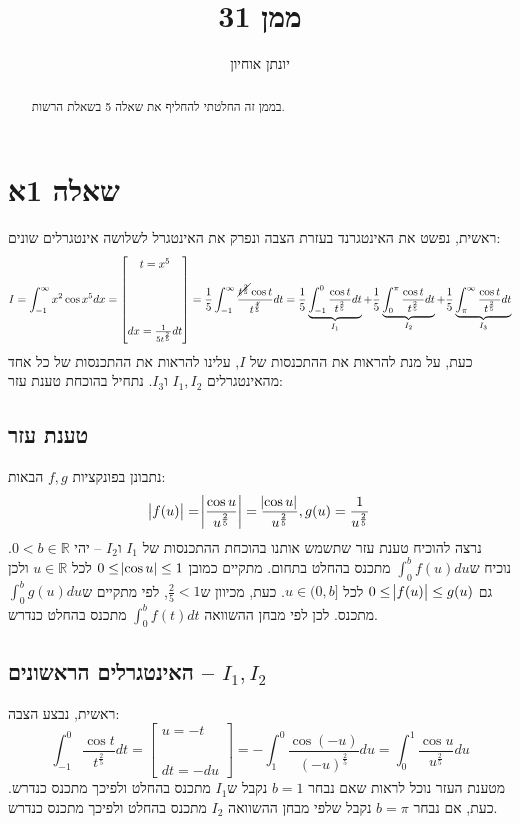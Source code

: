 \documentclass[11pt, oneside]{article}
\title{ממן 31}
\author{יונתן אוחיון}
\newcommand{\br}{\\\\\\\\\\}
\newcommand{\mR}{\mathbb{R}}
\renewcommand{\l}[3]{\R{למה #3#2.#1}}
\newcommand{\defi}[3]{\int_{#1}^{#2} #3}
\newcommand{\sub}[2]{\begin{bmatrix} #1\br #2\end{bmatrix}}
\begin{document}
\maketitle
\begin{abstract}
בממן זה החלטתי להחליף את שאלה 5 בשאלת הרשות.
\end{abstract}
\clearpage

\section*{שאלה 1א}
ראשית, נפשט את האינטגרנד בעזרת הצבה ונפרק את האינטגרל לשלושה אינטגרלים שונים:
\[
I = \defi{-1}{\infty}{x^{2}\cos{x^{5}}dx}
= \sub{t = x^{5}}{dx = \frac{1}{5t^{\frac{2}{5}}}dt}
= \frac{1}{5} \defi{-1}{\infty}{\frac{\cancel{t^{\frac{2}{5}}}\cos{t}}{t^{\frac{\not4}{5}}}dt}
= \frac{1}{5}
	\underbrace{
		\defi{-1}{0}{\frac{\cos{t}}{t^{\frac{2}{5}}}dt}
	}_{I_{1}} +
	\frac{1}{5}
	\underbrace{
		\defi{0}{\pi}{\frac{\cos{t}}{t^{\frac{2}{5}}}dt}
	}_{I_{2}} +
	\frac{1}{5}
	\underbrace{
		\defi{\pi}{\infty}{\frac{\cos{t}}{t^{\frac{2}{5}}}dt}
	}_{I_{3}}
\]
כעת, על מנת להראות את ההתכנסות של $I$, עלינו להראות את ההתכנסות של כל אחד מהאינטגרלים $I_{1}, I_{2}$ ו$I_{3}$. נתחיל בהוכחת טענת עזר:
\subsection*{טענת עזר}
נתבונן בפונקציות $f, g$ הבאות:
\[
\abs{f(u)} = \abs{\frac{\cos{u}}{u^{\frac{2}{5}}}} = \frac{\abs{\cos{u}}}{u^{\frac{2}{5}}}, g(u) = \frac{1}{u^{\frac{2}{5}}}
\]
נרצה להוכיח טענת עזר שתשמש אותנו בהוכחת ההתכנסות של $I_{1}$ ו$I_{2}$ -- יהי $0 < b \in \mR$. נוכיח ש$\defi{0}{b}{f(u)du}$ מתכנס בהחלט בתחום. מתקיים כמובן $0 \le \abs{\cos{u}} \le 1$ לכל $u \in \mR$ ולכן גם $0 \le \abs{f(u)} \le g(u)$ לכל $u \in (0, b]$. כעת, מכיוון ש$\frac{2}{5} < 1$, לפי \l{3}{2}{} מתקיים ש$\defi{0}{b}{g(u)du}$ מתכנס. לכן לפי מבחן ההשוואה $\defi{0}{b}{f(t)dt}$ מתכנס בהחלט כנדרש.

\subsection*{האינטגרלים הראשונים -- $I_{1}, I_{2}$}
ראשית, נבצע הצבה:
\[
\defi{-1}{0}{\frac{\cos{t}}{t^{\frac{2}{5}}}dt}
= \sub{u = -t}{dt = -du}
= -\defi{1}{0}{\frac{\cos({-u})}{(-u)^{\frac{2}{5}}}du}
= \defi{0}{1}{\frac{\cos{u}}{u^{\frac{2}{5}}}du}
\]
מטענת העזר נוכל לראות שאם נבחר $b = 1$ נקבל ש$I_{1}$ מתכנס בהחלט ולפיכך מתכנס כנדרש. כעת, אם נבחר $b = \pi$ נקבל שלפי מבחן ההשוואה $I_{2}$ מתכנס בהחלט ולפיכך מתכנס כנדרש.
\end{document}
